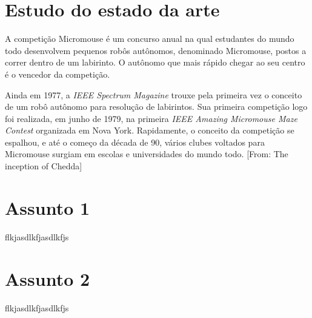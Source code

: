 \section{Estudo do estado da arte}
\label{sec:sota}
 \hspace{0.5cm} A competição Micromouse é um concurso anual na qual estudantes do mundo todo desenvolvem pequenos robôs autônomos, denominado Micromouse, postos a correr dentro de um labirinto. O autônomo que mais rápido chegar ao seu centro é o vencedor da competição.

 \hspace{0.5cm}  Ainda em 1977, a \textit{IEEE Spectrum Magazine} trouxe pela primeira vez o conceito de um robô autônomo para resolução de labirintos. Sua primeira competição logo foi realizada, em junho de 1979, na primeira \textit{IEEE Amazing Micromouse Maze Contest} organizada em Nova York. Rapidamente, o conceito da competição se espalhou, e até o começo da década de 90, vários clubes voltados para Micromouse surgiam em escolas e universidades do mundo todo. [From: The inception of Chedda]


\section{Assunto 1}
\label{sec:ass1}
flkjasdlkfjasdlkfjs

\section{Assunto 2}
\label{sec:ass2}
flkjasdlkfjasdlkfjs

